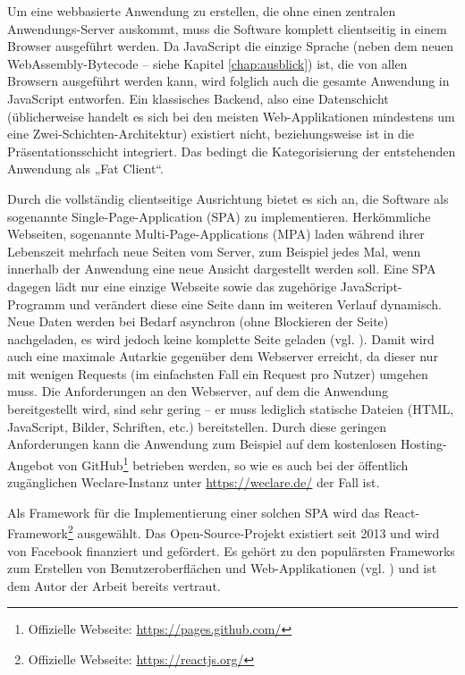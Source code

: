 Um eine webbasierte Anwendung zu erstellen, die ohne einen zentralen Anwendungs-Server auskommt, muss die Software komplett clientseitig in einem Browser ausgeführt werden. Da JavaScript die einzige Sprache (neben dem neuen WebAssembly-Bytecode – siehe Kapitel \ref{chap:ausblick}) ist, die von allen Browsern ausgeführt werden kann, wird folglich auch die gesamte Anwendung in JavaScript entworfen. Ein klassisches Backend, also eine Datenschicht (üblicherweise handelt es sich bei den meisten Web-Applikationen mindestens um eine Zwei-Schichten-Architektur) existiert nicht, beziehungsweise ist in die Präsentationsschicht integriert. Das bedingt die Kategorisierung der entstehenden Anwendung als „Fat Client“.

Durch die vollständig clientseitige Ausrichtung bietet es sich an, die Software als sogenannte Single-Page-Application (SPA) zu implementieren. Herkömmliche Webseiten, sogenannte Multi-Page-Applications (MPA) laden während ihrer Lebenszeit mehrfach neue Seiten vom Server, zum Beispiel jedes Mal, wenn innerhalb der Anwendung eine neue Ansicht dargestellt werden soll. Eine SPA dagegen lädt nur eine einzige Webseite sowie das zugehörige JavaScript-Programm und verändert diese eine Seite dann im weiteren Verlauf dynamisch. Neue Daten werden bei Bedarf asynchron (ohne Blockieren der Seite) nachgeladen, es wird jedoch keine komplette Seite geladen (vgl. \cite[S. 1]{art:single_page_multi_page}). Damit wird auch eine maximale Autarkie gegenüber dem Webserver erreicht, da dieser nur mit wenigen Requests (im einfachsten Fall ein Request pro Nutzer) umgehen muss. Die Anforderungen an den Webserver, auf dem die Anwendung bereitgestellt wird, sind sehr gering – er muss lediglich statische Dateien (HTML, JavaScript, Bilder, Schriften, etc.) bereitstellen. Durch diese geringen Anforderungen kann die Anwendung zum Beispiel auf dem kostenlosen Hosting-Angebot von GitHub\footnote{Offizielle Webseite: \url{https://pages.github.com/}} betrieben werden, so wie es auch bei der öffentlich zugänglichen Weclare-Instanz unter \url{https://weclare.de/} der Fall ist.

Als Framework für die Implementierung einer solchen SPA wird das React-Framework\footnote{Offizielle Webseite: \url{https://reactjs.org/}} ausgewählt. Das Open-Source-Projekt existiert seit 2013 und wird von Facebook finanziert und gefördert. Es gehört zu den populärsten Frameworks zum Erstellen von Benutzeroberflächen und Web-Applikationen (vgl. \cite{web:stackoverflow_umfrage}) und ist dem Autor der Arbeit bereits vertraut.

